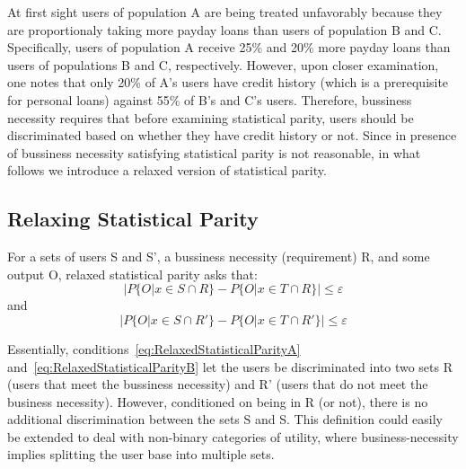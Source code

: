 At first sight users of population A are
being treated unfavorably because they are proportionaly taking more payday
loans than users of population B and C. Specifically, users of population A
receive 25\% and 20\% more payday loans than users of populations B and C,
respectively. However, upon closer examination, one notes that only 20\% of A’s
users have credit history (which is a prerequisite for personal loans) against
55\% of B’s and C’s users. Therefore, bussiness necessity requires that before
examining statistical parity, users should be discriminated based on whether
they have credit history or not. Since in presence of bussiness necessity 
satisfying statistical parity is not reasonable, in what follows we introduce
a relaxed version of statistical parity.

\subsection{Relaxing Statistical Parity}
For a sets of users S and S', a bussiness necessity (requirement) R, and some
output O, relaxed statistical parity asks that:
\begin{equation}
|P\{O | x \in S \cap R\} - P\{O | x \in T \cap R\}| \le \varepsilon
\label{eq:RelaxedStatisticalParityA}
\end{equation}
and
\begin{equation}
|P\{O | x \in S \cap R'\} - P\{O | x \in T \cap R'\}| \le \varepsilon
\label{eq:RelaxedStatisticalParityB}
\end{equation}

Essentially, conditions~\ref{eq:RelaxedStatisticalParityA}
and~\ref{eq:RelaxedStatisticalParityB} let the users be discriminated into two
sets R (users that meet the bussiness necessity) and R' (users that do not
meet the business necessity). However, conditioned on being in R (or not),
there is no additional discrimination between the sets S and S. This definition
could easily be extended to deal with non-binary categories of utility, where
business-necessity implies splitting the user base into multiple sets.


